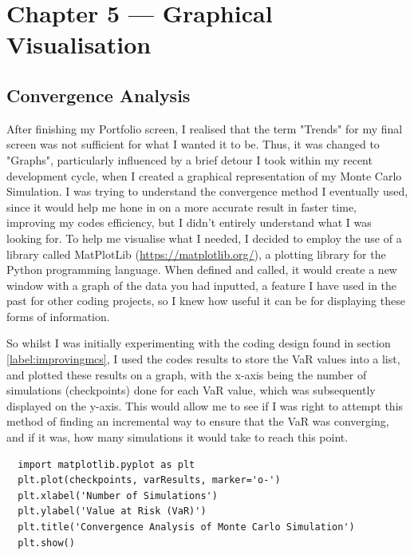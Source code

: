 \documentclass{article}
\begin{document}
\section{Chapter 5 --- Graphical Visualisation}

\subsection{Convergence Analysis}
After finishing my Portfolio screen, I realised that the term "Trends" for my final screen was not sufficient for what I wanted it to be. Thus, it was changed to "Graphs", particularly influenced by a brief detour I took within my recent development cycle, when I created a graphical representation of my Monte Carlo Simulation. I was trying to understand the convergence method I eventually used, since it would help me hone in on a more accurate result in faster time, improving my codes efficiency, but I didn't entirely understand what I was looking for. To help me visualise what I needed, I decided to employ the use of a library called MatPlotLib (\url{https://matplotlib.org/}), a plotting library for the Python programming language. When defined and called, it would create a new window with a graph of the data you had inputted, a feature I have used in the past for other coding projects, so I knew how useful it can be for displaying these forms of information.\\\vspace{0.3cm}

So whilst I was initially experimenting with the coding design found in section \ref{label:improvingmcs}, I used the codes results to store the VaR values into a list, and plotted these results on a graph, with the x-axis being the number of simulations (checkpoints) done for each VaR value, which was subsequently displayed on the y-axis. This would allow me to see if I was right to attempt this method of finding an incremental way to ensure that the VaR was converging, and if it was, how many simulations it would take to reach this point.\\\vspace{0.3cm}

\begin{verbatim}
  import matplotlib.pyplot as plt
  plt.plot(checkpoints, varResults, marker='o-')
  plt.xlabel('Number of Simulations')
  plt.ylabel('Value at Risk (VaR)')
  plt.title('Convergence Analysis of Monte Carlo Simulation')
  plt.show()
\end{verbatim}
\end{document}
